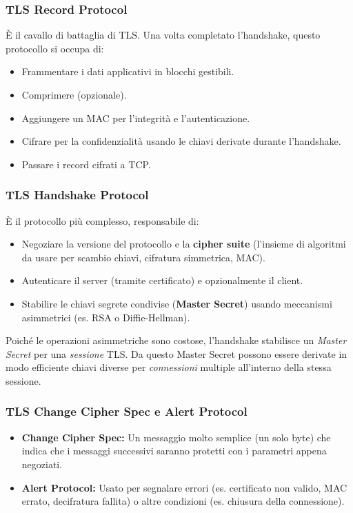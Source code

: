 \documentclass[../main.tex]{subfiles}
\begin{document}
\subsubsection{TLS Record Protocol}
È il cavallo di battaglia di TLS. Una volta completato l'handshake, questo protocollo si occupa di:
\begin{itemize}
    \item Frammentare i dati applicativi in blocchi gestibili.
    \item Comprimere (opzionale).
    \item Aggiungere un MAC per l'integrità e l'autenticazione.
    \item Cifrare per la confidenzialità usando le chiavi derivate durante l'handshake.
    \item Passare i record cifrati a TCP.
\end{itemize}

\subsubsection{TLS Handshake Protocol}
È il protocollo più complesso, responsabile di:
\begin{itemize}
    \item Negoziare la versione del protocollo e la \textbf{cipher suite} (l'insieme di algoritmi da usare per scambio chiavi, cifratura simmetrica, MAC).
    \item Autenticare il server (tramite certificato) e opzionalmente il client.
    \item Stabilire le chiavi segrete condivise (\textbf{Master Secret}) usando meccanismi asimmetrici (es. RSA o Diffie-Hellman).
\end{itemize}
Poiché le operazioni asimmetriche sono costose, l'handshake stabilisce un \emph{Master Secret} per una \emph{sessione} TLS. Da questo Master Secret possono essere derivate in modo efficiente chiavi diverse per \emph{connessioni} multiple all'interno della stessa sessione.

\subsubsection{TLS Change Cipher Spec e Alert Protocol}
\begin{itemize}
    \item \textbf{Change Cipher Spec:} Un messaggio molto semplice (un solo byte) che indica che i messaggi successivi saranno protetti con i parametri appena negoziati.
    \item \textbf{Alert Protocol:} Usato per segnalare errori (es. certificato non valido, MAC errato, decifratura fallita) o altre condizioni (es. chiusura della connessione).
\end{itemize}
\end{document}
